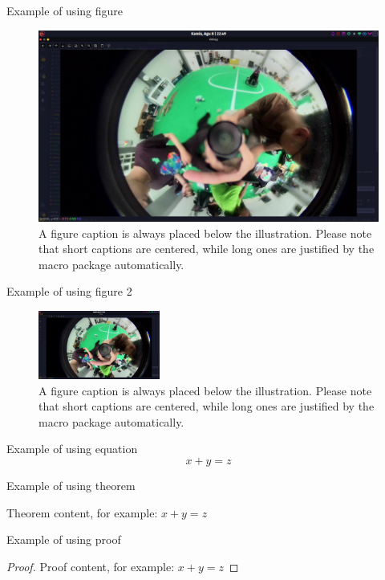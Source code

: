 Example of using figure 
\begin{figure}[htbp]
    \centering
    \includegraphics[width=\textwidth]{images/leopard3.png}
    \caption{A figure caption is always placed below the illustration.
    Please note that short captions are centered, while long ones are
    justified by the macro package automatically.} \label{fig1}
\end{figure}
\FloatBarrier

Example of using figure 2 
\begin{figure}[htbp]
    \centering
    \includegraphics[width=4cm]{images/leopard3.png}
    \caption{A figure caption is always placed below the illustration.
    Please note that short captions are centered, while long ones are
    justified by the macro package automatically.} \label{fig2}
\end{figure}
\FloatBarrier

Example of using equation 
\begin{equation}
    x + y = z
\end{equation}

Example of using theorem
\begin{theorem}
    Theorem content, for example: $x + y = z$
\end{theorem}

Example of using proof
\begin{proof}
    Proof content, for example: $x + y = z$
\end{proof}

